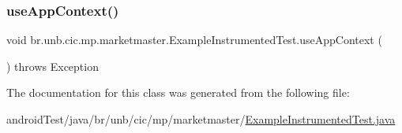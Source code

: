 \subsubsection{\texorpdfstring{use\+App\+Context()}{useAppContext()}}
{\footnotesize\ttfamily void br.\+unb.\+cic.\+mp.\+marketmaster.\+Example\+Instrumented\+Test.\+use\+App\+Context (\begin{DoxyParamCaption}{ }\end{DoxyParamCaption}) throws Exception}



The documentation for this class was generated from the following file\+:\begin{DoxyCompactItemize}
\item 
android\+Test/java/br/unb/cic/mp/marketmaster/\mbox{\hyperlink{ExampleInstrumentedTest_8java}{Example\+Instrumented\+Test.\+java}}\end{DoxyCompactItemize}
